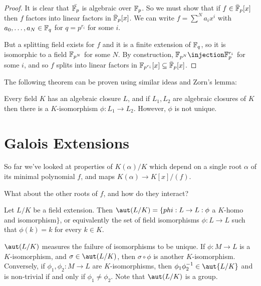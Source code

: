 \documentclass[a4paper, 10pt, twocolumn]{amsart}
\begin{document}
\begin{proof}
It is clear that $\bar{\mathbb{F}_p}$ is algebraic over $\mathbb{F}_p$. So we must show that if $f \in \bar{\mathbb{F}}_p[x]$ then $f$ factors into linear factors in $\bar{\mathbb{F}}_p[x]$. We can write $f = \sum^N a_i x^i$ with $a_0, \ldots, a_N \in \mathbb{F}_q$ for $q=p^{r_i}$ for some $i$.

But a splitting field exists for $f$ and it is a finite extension of $\mathbb{F}_q$, so it is isomorphic to a field $\mathbb{F}_{p^N}$ for some $N$. By construction, $\F_{p^N} \injection \F_p^{r_i}$ for some $i$, and so $f$ splits into linear factors in $\mathbb{F}_{p^{r_i}}[x] \subseteq \bar{\mathbb{F}}_p[x]$.
\end{proof}
The following theorem can be proven using similar ideas and Zorn's lemma:
\begin{theorem}
Every field $K$ has an algebraic closure $L$, and if $L_1, L_2$ are algebraic closures of $K$ then there is a $K$-isomorphism $\phi:L_1\to L_2$. However, $\phi$ is not unique.
\end{theorem}

\section{Galois Extensions}
So far we've looked at properties of $K(\alpha)/K$ which depend on a single root $\alpha$ of its minimal polynomial $f$, and maps $K(\alpha) \to K[x]/(f)$.

What about the other roots of $f$, and how do they interact?

Let $L/K$ be a field extension. Then $\aut(L/K) = \{phi : L \to L : \phi $ a $K$-homo and isomorphism$\}$, or equivalently the set of field isomorphisms $\phi:L\to L$ such that $\phi(k) = k$ for every $k \in K$.

$\aut(L/K)$ measures the failure of isomorphisms to be unique. If $\phi : M \to L$ is a $K$-isomorphism, and $\sigma \in \aut(L/K)$, then $\sigma \circ \phi$ is another $K$-isomorphism. Conversely, if $\phi_1, \phi_2: M \to L$ are $K$-isomorphisms, then $\phi_1 \phi_2^{-1} \in \aut{L/K}$ and is non-trivial if and only if $\phi_1 \neq \phi_2$. Note that $\aut(L/K)$ is a group.
\end{document}
